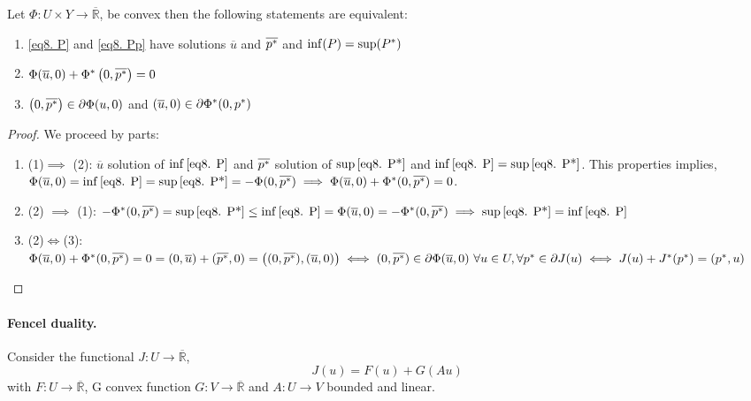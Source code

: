 \begin{theorem}
	Let $\Phi:U\times Y \rightarrow \overline{\mathbb{R}}$, be convex then the following statements are equivalent:
	
	\begin{enumerate}[]
		\item \eqref{eq8. P} and \eqref{eq8. Pp} have solutions $\overline{u}$ and $\overline{{p}^{\ast}}$ and $\inf(P)=\sup({P}^{\ast})$
		\item $\Phi(\overline{u}, 0)+{\Phi}^{\ast}\left(0, \overline{{p}^{\ast}}\right)=0$
		\item $\left(0, \overline{{p}^{\ast}}\right) \in \partial \Phi (u,0)$ and $ \left(\overline{u}, 0\right) \in \partial {\Phi}^{\ast}(0,{p}^{\ast})$
	\end{enumerate}
	\begin{proof}
		We proceed by parts:
		\begin{enumerate}
			\item (1)$\implies$ (2): $\overline{u}$ solution of $\inf\eqref{eq8. P}$ and $\overline{{p}^{\ast}}$ solution of $\sup\eqref{eq8. P*}$ and $\inf\eqref{eq8. P}=\sup\eqref{eq8. P*}$. This properties implies, $
			\Phi(\overline{u},0)=\inf\eqref{eq8. P}=\sup\eqref{eq8. P*}=-\Phi(0,\overline{{p}^{\ast}})\implies \Phi(\overline{u}, 0)+{\Phi}^{\ast}(0, \overline{{p}^{\ast}}) =0$.
			\item (2) $\implies$ (1): $-{\Phi}^{\ast}(0, \overline{{p}^{\ast}})=\sup\eqref{eq8. P*}\leq \inf\eqref{eq8. P}=\Phi(\overline{u}, 0)=-{\Phi}^{\ast}(0, \overline{{p}^{\ast}}) \implies \sup\eqref{eq8. P*}=\inf\eqref{eq8. P}$
			\item (2)$\iff$(3): $\Phi(\overline{u},0)+{\Phi}^{\ast}(0, \overline{{p}^{\ast}})=0=(0, \overline{u}) +(\overline{{p}^{\ast}},0)=\left((0, \overline{{p}^{\ast}}), (\overline{u},0)\right) \iff (0, \overline{{p}^{\ast}}) \in \partial\Phi(\overline{u},0) \ \forall u \in U,  \forall {p}^{\ast} \in \partial J(u) \iff J(u)+{J}^{\ast}({p}^{\ast})=({p}^{\ast}, u)$
		\end{enumerate}
	\end{proof}
\end{theorem}
\paragraph{Fencel duality.}
Consider the functional $J:U\rightarrow\overline{\mathbb{R}}$, 
\[
	J(u)=F(u)+G(Au)
\]
 with $F:U\rightarrow\overline{\mathbb{R}}$,  G convex function $G: V\rightarrow \overline{\mathbb{R}}$ and $A:U\rightarrow V$ bounded and linear.
 
